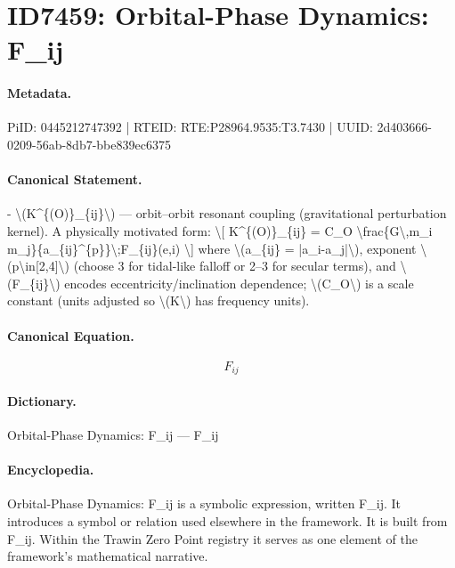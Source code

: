 \section*{ID7459: Orbital-Phase Dynamics: F\_ij}
\paragraph{Metadata.}
PiID: 0445212747392 | RTEID: RTE:P28964.9535:T3.7430 | UUID: 2d403666-0209-56ab-8db7-bbe839ec6375

\paragraph{Canonical Statement.}
- \textbackslash{}(K\textasciicircum{}\{(O)\}\_\{ij\}\textbackslash{}) — orbit–orbit resonant coupling (gravitational perturbation kernel). A physically motivated form: \textbackslash{}[ K\textasciicircum{}\{(O)\}\_\{ij\} = C\_O \textbackslash{}frac\{G\textbackslash{},m\_i m\_j\}\{a\_\{ij\}\textasciicircum{}\{p\}\}\textbackslash{};F\_\{ij\}(e,i) \textbackslash{}] where \textbackslash{}(a\_\{ij\} = |a\_i-a\_j|\textbackslash{}), exponent \textbackslash{}(p\textbackslash{}in[2,4]\textbackslash{}) (choose 3 for tidal-like falloff or 2–3 for secular terms), and \textbackslash{}(F\_\{ij\}\textbackslash{}) encodes eccentricity/inclination dependence; \textbackslash{}(C\_O\textbackslash{}) is a scale constant (units adjusted so \textbackslash{}(K\textbackslash{}) has frequency units).

\paragraph{Canonical Equation.}
\[
F_{ij}
\]

\paragraph{Dictionary.}
Orbital-Phase Dynamics: F\_ij — F\_ij

\paragraph{Encyclopedia.}
Orbital-Phase Dynamics: F\_ij is a symbolic expression, written F\_ij. It introduces a symbol or relation used elsewhere in the framework. It is built from F\_ij. Within the Trawin Zero Point registry it serves as one element of the framework's mathematical narrative.
